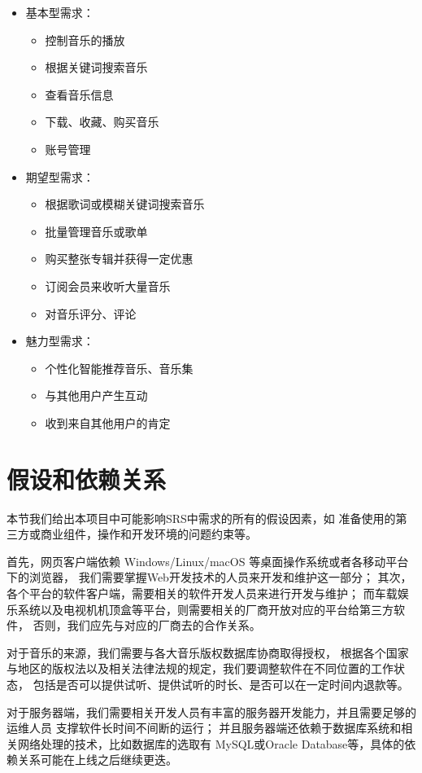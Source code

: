 \begin{itemize}
    \item 基本型需求：
    \begin{itemize}
        \item 控制音乐的播放
        \item 根据关键词搜索音乐
        \item 查看音乐信息
        \item 下载、收藏、购买音乐
        \item 账号管理
    \end{itemize}
    \item 期望型需求：
    \begin{itemize}
        \item 根据歌词或模糊关键词搜索音乐
        \item 批量管理音乐或歌单
        \item 购买整张专辑并获得一定优惠
        \item 订阅会员来收听大量音乐
        \item 对音乐评分、评论
    \end{itemize}
    \item 魅力型需求：
    \begin{itemize}
        \item 个性化智能推荐音乐、音乐集
        \item 与其他用户产生互动
        \item 收到来自其他用户的肯定
    \end{itemize}
\end{itemize}



\section{假设和依赖关系}

本节我们给出本项目中可能影响SRS中需求的所有的假设因素，如
    准备使用的第三方或商业组件，操作和开发环境的问题约束等。

首先，网页客户端依赖 Windows/Linux/macOS 等桌面操作系统或者各移动平台下的浏览器，
    我们需要掌握Web开发技术的人员来开发和维护这一部分；
其次，各个平台的软件客户端，需要相关的软件开发人员来进行开发与维护；
而车载娱乐系统以及电视机机顶盒等平台，则需要相关的厂商开放对应的平台给第三方软件，
    否则，我们应先与对应的厂商去的合作关系。

对于音乐的来源，我们需要与各大音乐版权数据库协商取得授权，
    根据各个国家与地区的版权法以及相关法律法规的规定，我们要调整软件在不同位置的工作状态，
    包括是否可以提供试听、提供试听的时长、是否可以在一定时间内退款等。

对于服务器端，我们需要相关开发人员有丰富的服务器开发能力，并且需要足够的运维人员
    支撑软件长时间不间断的运行；
并且服务器端还依赖于数据库系统和相关网络处理的技术，比如数据库的选取有
    MySQL或Oracle Database等，具体的依赖关系可能在上线之后继续更迭。